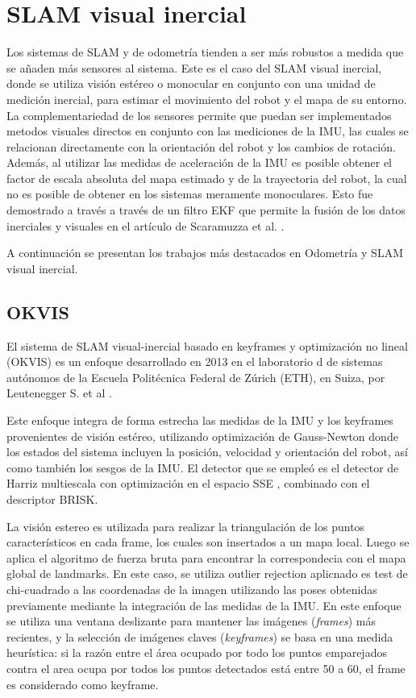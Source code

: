 \section{SLAM visual inercial}

Los sistemas de SLAM y de odometría tienden a ser más robustos a medida que se añaden más sensores al sistema. Este es el caso del SLAM visual inercial, donde se utiliza visión estéreo o monocular en conjunto con una unidad de medición inercial, para estimar el movimiento del robot y el mapa de su entorno.  La complementariedad de los sensores permite que puedan ser implementados metodos visuales directos en conjunto con las mediciones de la IMU, las cuales se relacionan directamente con la orientación del robot y los cambios de rotación. Además, al utilizar las medidas de aceleración de la IMU es posible obtener el factor de escala absoluta  del mapa estimado y de la trayectoria del robot, la cual no es posible de obtener en los sistemas meramente monoculares. Esto fue demostrado a través a través de un filtro EKF que permite la fusión de los datos inerciales y visuales en el artículo de  Scaramuzza et al. \cite{scaramuzza}.

A continuación se presentan los trabajos más destacados en Odometría y SLAM visual inercial.

\subsection{OKVIS}

El sistema de SLAM visual-inercial basado en keyframes y optimización no lineal (OKVIS)  es un enfoque desarrollado en 2013 en el laboratorio d de sistemas autónomos de la Escuela Politécnica Federal de Zúrich (ETH), en Suiza, por  Leutenegger S. et al \cite{okvis}.


Este enfoque integra de forma estrecha las medidas de la IMU y los keyframes provenientes de visión estéreo, utilizando optimización de Gauss-Newton donde los estados del sistema incluyen la posición, velocidad y orientación del robot, así como también los sesgos de la IMU. El detector que se empleó es el detector de Harriz multiescala con optimización en el espacio SSE , combinado con el descriptor BRISK. 

La visión estereo es utilizada para realizar la triangulación de los puntos característicos en cada frame, los cuales son insertados a un mapa local. Luego se aplica el algoritmo de fuerza bruta para encontrar la correspondecia con el mapa global de landmarks. En este caso, se utiliza outlier rejection aplicnado es test de chi-cuadrado a las coordenadas de la imagen utilizando las poses obtenidas previamente mediante la integración de las medidas de la IMU.
En este enfoque se utiliza una ventana deslizante para mantener las imágenes (\textit{frames}) más recientes, y la selección de imágenes claves (\textit{keyframes}) se basa en una medida heurística: si la razón entre el área ocupado por todo los puntos emparejados contra el area ocupa por todos los puntos detectados está entre 50 a 60, el frame es considerado como keyframe.

